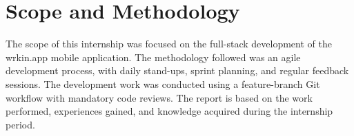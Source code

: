 \section{Scope and Methodology}
The scope of this internship was focused on the full-stack development of the wrkin.app mobile application. The methodology followed was an agile development process, with daily stand-ups, sprint planning, and regular feedback sessions. The development work was conducted using a feature-branch Git workflow with mandatory code reviews. The report is based on the work performed, experiences gained, and knowledge acquired during the internship period.
